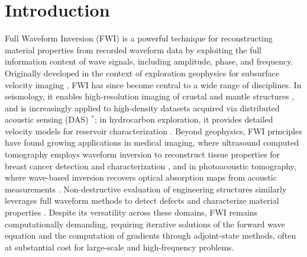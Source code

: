 \documentclass[11pt,a4paper]{article}
\newcommand{\newcite}[1]{\textcolor{todoRed}{$^{\ast}$}\citep{#1}}
\begin{document}
\section{Introduction}

Full Waveform Inversion (FWI) is a powerful technique for reconstructing material properties from recorded waveform data by exploiting the full information content of wave signals, including amplitude, phase, and frequency. Originally developed in the context of exploration geophysics for subsurface velocity imaging \citep{Tarantola1984}, FWI has since become central to a wide range of disciplines. In seismology, it enables high-resolution imaging of crustal and mantle structures \citep{Fichtner2009, Ebru2011}, and is increasingly applied to high-density datasets acquired via distributed acoustic sensing (DAS) \newcite{Zhan2020}; in hydrocarbon exploration, it provides detailed velocity models for reservoir characterization \citep{Virieux2009}. Beyond geophysics, FWI principles have found growing applications in medical imaging, where ultrasound computed tomography employs waveform inversion to reconstruct tissue properties for breast cancer detection and characterization \citep{10.1121/1.3699240, Sandhu_2015}, and in photoacoustic tomography, where wave-based inversion recovers optical absorption maps from acoustic measurements \citep{Wang2016}. Non-destructive evaluation of engineering structures similarly leverages full waveform methods to detect defects and characterize material properties \citep{7422116}. Despite its versatility across these domains, FWI remains computationally demanding, requiring iterative solutions of the forward wave equation and the computation of gradients through adjoint-state methods, often at substantial cost for large-scale and high-frequency problems.
\end{document}
